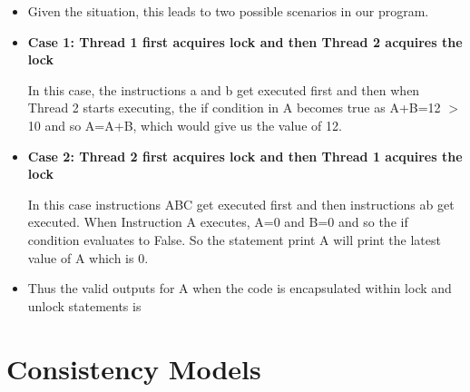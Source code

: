 \documentclass[11pt]{article}
\begin{document}
\begin{itemize}
\item[] Given the situation, this leads to two possible scenarios in our program.

\item[] \textbf {Case 1: Thread 1 first acquires lock and then Thread 2 acquires the lock}

In this case, the instructions a and b get executed first and then when Thread 2 starts executing, the if condition in A becomes true as A+B=12 $>$ 10 and so A=A+B, which would give us the value of 12.

\item[] \textbf {Case 2: Thread 2 first acquires lock and then Thread 1 acquires the lock}

In this case instructions ABC get executed first and then instructions ab get executed. When Instruction A executes, A=0 and B=0 and so the if condition evaluates to False. So the statement print A will print the latest value of A which is 0.

\item[] Thus the valid outputs for A when the code is encapsulated within lock and unlock statements is \textbf {}
\end{itemize}	


\section{Consistency Models}
\end{document}
